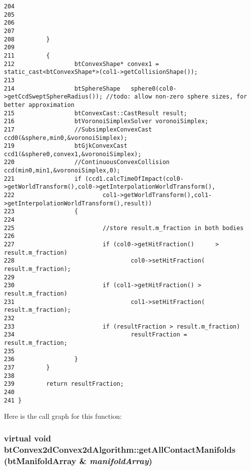 \begin{Code}
\begin{verbatim}
204 
205 
206 
207 
208         }
209 
211         {
212                 btConvexShape* convex1 = static_cast<btConvexShape*>(col1->getCollisionShape());
213 
214                 btSphereShape   sphere0(col0->getCcdSweptSphereRadius()); //todo: allow non-zero sphere sizes, for better approximation
215                 btConvexCast::CastResult result;
216                 btVoronoiSimplexSolver voronoiSimplex;
217                 //SubsimplexConvexCast ccd0(&sphere,min0,&voronoiSimplex);
219                 btGjkConvexCast ccd1(&sphere0,convex1,&voronoiSimplex);
220                 //ContinuousConvexCollision ccd(min0,min1,&voronoiSimplex,0);
221                 if (ccd1.calcTimeOfImpact(col0->getWorldTransform(),col0->getInterpolationWorldTransform(),
222                         col1->getWorldTransform(),col1->getInterpolationWorldTransform(),result))
223                 {
224 
225                         //store result.m_fraction in both bodies
226 
227                         if (col0->getHitFraction()      > result.m_fraction)
228                                 col0->setHitFraction( result.m_fraction);
229 
230                         if (col1->getHitFraction() > result.m_fraction)
231                                 col1->setHitFraction( result.m_fraction);
232 
233                         if (resultFraction > result.m_fraction)
234                                 resultFraction = result.m_fraction;
235 
236                 }
237         }
238 
239         return resultFraction;
240 
241 }
\end{verbatim}
\end{Code}




Here is the call graph for this function:\hypertarget{classbt_convex2d_convex2d_algorithm_de3af2f3f04d9b202535d33550a94be4}{
\subsubsection[getAllContactManifolds]{\setlength{\rightskip}{0pt plus 5cm}virtual void btConvex2dConvex2dAlgorithm::getAllContactManifolds ({\bf btManifoldArray} \& {\em manifoldArray})}}
\label{classbt_convex2d_convex2d_algorithm_de3af2f3f04d9b202535d33550a94be4}




